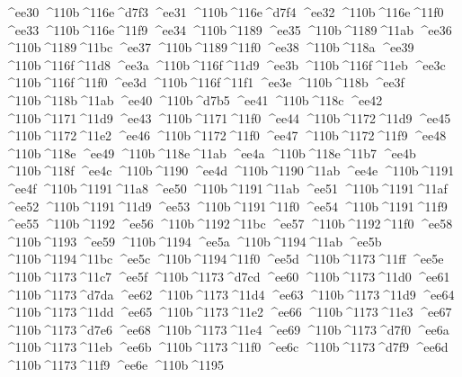 \checkit ^^^^ee30 ^^^^110b^^^^116e^^^^d7f3
\checkit ^^^^ee31 ^^^^110b^^^^116e^^^^d7f4
\checkit ^^^^ee32 ^^^^110b^^^^116e^^^^11f0
\checkit ^^^^ee33 ^^^^110b^^^^116e^^^^11f9
\checkit ^^^^ee34 ^^^^110b^^^^1189
\checkit ^^^^ee35 ^^^^110b^^^^1189^^^^11ab
\checkit ^^^^ee36 ^^^^110b^^^^1189^^^^11bc
\checkit ^^^^ee37 ^^^^110b^^^^1189^^^^11f0
\checkit ^^^^ee38 ^^^^110b^^^^118a
\checkit ^^^^ee39 ^^^^110b^^^^116f^^^^11d8
\checkit ^^^^ee3a ^^^^110b^^^^116f^^^^11d9
\checkit ^^^^ee3b ^^^^110b^^^^116f^^^^11eb
\checkit ^^^^ee3c ^^^^110b^^^^116f^^^^11f0
\checkit ^^^^ee3d ^^^^110b^^^^116f^^^^11f1
\checkit ^^^^ee3e ^^^^110b^^^^118b
\checkit ^^^^ee3f ^^^^110b^^^^118b^^^^11ab
\checkit ^^^^ee40 ^^^^110b^^^^d7b5
\checkit ^^^^ee41 ^^^^110b^^^^118c
\checkit ^^^^ee42 ^^^^110b^^^^1171^^^^11d9
\checkit ^^^^ee43 ^^^^110b^^^^1171^^^^11f0
\checkit ^^^^ee44 ^^^^110b^^^^1172^^^^11d9
\checkit ^^^^ee45 ^^^^110b^^^^1172^^^^11e2
\checkit ^^^^ee46 ^^^^110b^^^^1172^^^^11f0
\checkit ^^^^ee47 ^^^^110b^^^^1172^^^^11f9
\checkit ^^^^ee48 ^^^^110b^^^^118e
\checkit ^^^^ee49 ^^^^110b^^^^118e^^^^11ab
\checkit ^^^^ee4a ^^^^110b^^^^118e^^^^11b7
\checkit ^^^^ee4b ^^^^110b^^^^118f
\checkit ^^^^ee4c ^^^^110b^^^^1190
\checkit ^^^^ee4d ^^^^110b^^^^1190^^^^11ab
\checkit ^^^^ee4e ^^^^110b^^^^1191
\checkit ^^^^ee4f ^^^^110b^^^^1191^^^^11a8
\checkit ^^^^ee50 ^^^^110b^^^^1191^^^^11ab
\checkit ^^^^ee51 ^^^^110b^^^^1191^^^^11af
\checkit ^^^^ee52 ^^^^110b^^^^1191^^^^11d9
\checkit ^^^^ee53 ^^^^110b^^^^1191^^^^11f0
\checkit ^^^^ee54 ^^^^110b^^^^1191^^^^11f9
\checkit ^^^^ee55 ^^^^110b^^^^1192
\checkit ^^^^ee56 ^^^^110b^^^^1192^^^^11bc
\checkit ^^^^ee57 ^^^^110b^^^^1192^^^^11f0
\checkit ^^^^ee58 ^^^^110b^^^^1193
\checkit ^^^^ee59 ^^^^110b^^^^1194
\checkit ^^^^ee5a ^^^^110b^^^^1194^^^^11ab
\checkit ^^^^ee5b ^^^^110b^^^^1194^^^^11bc
\checkit ^^^^ee5c ^^^^110b^^^^1194^^^^11f0
\checkit ^^^^ee5d ^^^^110b^^^^1173^^^^11ff
\checkit ^^^^ee5e ^^^^110b^^^^1173^^^^11c7
\checkit ^^^^ee5f ^^^^110b^^^^1173^^^^d7cd
\checkit ^^^^ee60 ^^^^110b^^^^1173^^^^11d0
\checkit ^^^^ee61 ^^^^110b^^^^1173^^^^d7da
\checkit ^^^^ee62 ^^^^110b^^^^1173^^^^11d4
\checkit ^^^^ee63 ^^^^110b^^^^1173^^^^11d9
\checkit ^^^^ee64 ^^^^110b^^^^1173^^^^11dd
\checkit ^^^^ee65 ^^^^110b^^^^1173^^^^11e2
\checkit ^^^^ee66 ^^^^110b^^^^1173^^^^11e3
\checkit ^^^^ee67 ^^^^110b^^^^1173^^^^d7e6
\checkit ^^^^ee68 ^^^^110b^^^^1173^^^^11e4
\checkit ^^^^ee69 ^^^^110b^^^^1173^^^^d7f0
\checkit ^^^^ee6a ^^^^110b^^^^1173^^^^11eb
\checkit ^^^^ee6b ^^^^110b^^^^1173^^^^11f0
\checkit ^^^^ee6c ^^^^110b^^^^1173^^^^d7f9
\checkit ^^^^ee6d ^^^^110b^^^^1173^^^^11f9
\checkit ^^^^ee6e ^^^^110b^^^^1195
